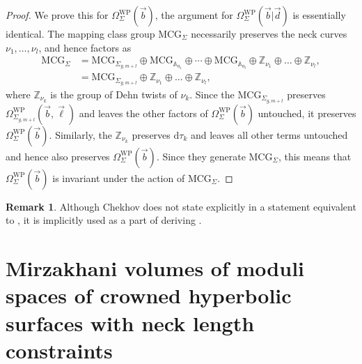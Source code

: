 \documentclass{amsart}
\theoremstyle{definition}
\newtheorem{remark}[proposition]{Remark}
\begin{document}
\begin{proof}
    We prove this for $\Omega^{\mathrm{WP}}_{\Sigma}(\vec{b})$, the argument for $\Omega^{\mathrm{WP}}_{\Sigma}(\vec{b}|\vec{d})$ is essentially identical. The mapping class group $\mathrm{MCG}_\Sigma$ necessarily preserves the neck curves $\nu_1,\ldots,\nu_l$, and hence factors as 
    \begin{align*}
    \mathrm{MCG}_{\Sigma}
    &=
    \mathrm{MCG}_{\Sigma_{g,m+l}}
    \oplus
    \mathrm{MCG}_{\mathbb{A}_{a_1}}
    \oplus\cdots\oplus
    \mathrm{MCG}_{\mathbb{A}_{a_l}}
    \oplus
    \mathbb{Z}_{\nu_1}
    \oplus\ldots\oplus
    \mathbb{Z}_{\nu_l},\\
    &=
    \mathrm{MCG}_{\Sigma_{g,m+l}}
    \oplus
    \mathbb{Z}_{\nu_1}
    \oplus\ldots\oplus
    \mathbb{Z}_{\nu_l},
    \end{align*}
    where $\mathbb{Z}_{\nu_k}$ is the group of Dehn twists of $\nu_k$. Since the $\mathrm{MCG}_{\Sigma_{g,m+l}}$ preserves $\Omega^{\mathrm{WP}}_{\Sigma_{g,m+l}}(\vec{b},\vec{\ell})$ and leaves the other factors of $\Omega^{\mathrm{WP}}_{\Sigma}(\vec{b})$ untouched, it preserves $\Omega^{\mathrm{WP}}_{\Sigma}(\vec{b})$. Similarly, the $\mathbb{Z}_{\nu_k}$ preserves $\mathrm{d}\tau_k$ and leaves all other terms untouched and hence also preserves $\Omega^{\mathrm{WP}}_{\Sigma}(\vec{b})$. Since they generate $\mathrm{MCG}_{\Sigma}$, this means that $\Omega^{\mathrm{WP}}_{\Sigma}(\vec{b})$ is invariant under the action of $\mathrm{MCG}_{\Sigma}$.
\end{proof}

\begin{remark}
    Although Chekhov does not state explicitly in \cite{chekhov2024} a statement equivalent to , it is implicitly used as a part of deriving \cite[Lemma~2.6]{chekhov2024}. 
\end{remark}
















\section{Mirzakhani volumes of moduli spaces of crowned hyperbolic surfaces with neck length constraints}
\label{sec:vol-mod-space-crowns}
\end{document}
